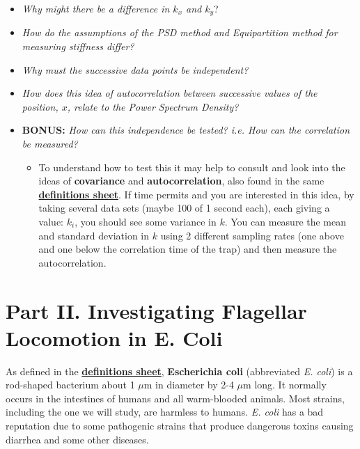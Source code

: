 \documentclass{../lab}
\begin{document}


\begin{itemize}
    \item \emph{Why might there be a difference in $k_x$ and $k_y$}?

    \item \emph{How do the assumptions of the PSD method and Equipartition method for measuring stiffness differ?}

    \item \emph{Why must the successive data points be independent?}

    \item \emph{How does this idea of autocorrelation between successive values of the position, $x$, relate to the Power Spectrum Density?}

    \item \textbf{BONUS:} \emph{How can this independence be tested? i.e. How can the correlation be measured?}

    \begin{itemize}
        \item To understand how to test this it may help to consult \cite{Reif} and look into the ideas of \textbf{covariance} and \textbf{autocorrelation}, also found in the same \href{http://physics111.lib.berkeley.edu/Physics111/Reprints/OTZ/biowikipedia.pdf}{\textbf{definitions sheet}}. If time permits and you are interested in this idea, by taking several data sets (maybe 100 of 1 second each), each giving a value: $k_i$, you should see some variance in $k$. You can measure the mean and standard deviation in $k$ using 2 different sampling rates (one above and one below the correlation time of the trap) and then measure the autocorrelation.
    \end{itemize}

\end{itemize}

\section{Part II. Investigating Flagellar Locomotion in E. Coli}

As defined in the \href{http://physics111.lib.berkeley.edu/Physics111/Reprints/OTZ/biowikipedia.pdf}{\textbf{definitions sheet}}, \textbf{Escherichia coli} (abbreviated \emph{E. coli}) is a rod-shaped bacterium about 1 $\mu$m in diameter by 2-4 $\mu$m long. It normally occurs in the intestines of humans and all warm-blooded animals. Most strains, including the one we will study, are harmless to humans. \emph{E. coli} has a bad reputation due to some pathogenic strains that produce dangerous toxins causing diarrhea and some other diseases.
\end{document}
